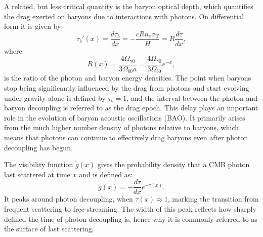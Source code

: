 \documentclass{aa}
\numberwithin{equation}{section}
\numberwithin{table}{section}
\numberwithin{figure}{section}
\begin{document}

A related, but less critical quantity is the baryon optical depth, which quantifies the drag exerted on baryons due to interactions with photons. On differential form it is given by:
\begin{equation}
\tau_b'(x) = \frac{d\tau_b}{dx} = -\frac{c Rn_e \sigma_\text{T}}{H} = R\frac{d\tau}{dx},
\end{equation}
where
\begin{equation}
  R(x) = \frac{4\Omega_{\gamma0}}{3\Omega_{b0}a} = \frac{4\Omega_{\gamma0}}{3\Omega_{b0}}e^{-x}, \label{eq: R}
\end{equation}
is the ratio of the photon and baryon energy densities. The point when baryons stop being significantly influenced by the drag from photons and start evolving under gravity alone is defined by $\tau_b = 1$, and the interval between the photon and baryon decoupling is referred to as the drag epoch. This delay plays an important role in the evolution of baryon acoustic oscillations (BAO). It primarily arises from the much higher number density of photons relative to baryons, which means that photons can continue to effectively drag baryons even after photon decoupling has begun.

The visibility function $\tilde{g}(x)$ gives the probability density that a CMB photon last scattered at time $x$ and is defined as:
\begin{equation}
\tilde{g}(x) = -\frac{d\tau}{dx} e^{-\tau(x)}.
\end{equation}
It peaks around photon decoupling, when $\tau(x) \approx 1$, marking the transition from frequent scattering to free-streaming. The width of this peak reflects how sharply defined the time of photon decoupling is, hence why it is commonly referred to as the surface of last scattering. 
\end{document}
